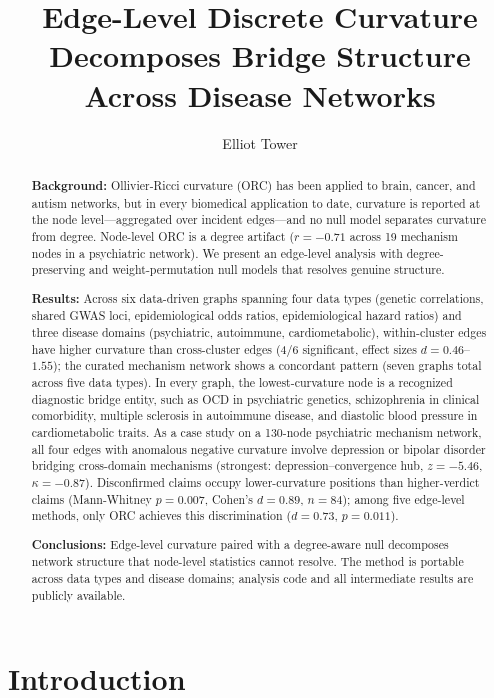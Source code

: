 \documentclass[11pt]{article}
\title{Edge-Level Discrete Curvature Decomposes Bridge Structure Across Disease Networks}
\author{Elliot Tower}
\affil{Independent researcher \\ \texttt{elliot@elliottower.ai}}
\date{}
\begin{document}
\maketitle

\begin{abstract}
\textbf{Background:}
Ollivier-Ricci curvature (ORC) has been applied to brain, cancer, and autism networks, but in every biomedical application to date, curvature is reported at the node level---aggregated over incident edges---and no null model separates curvature from degree. Node-level ORC is a degree artifact ($r = -0.71$ across 19 mechanism nodes in a psychiatric network). We present an edge-level analysis with degree-preserving and weight-permutation null models that resolves genuine structure.

\textbf{Results:}
Across six data-driven graphs spanning four data types (genetic correlations, shared GWAS loci, epidemiological odds ratios, epidemiological hazard ratios) and three disease domains (psychiatric, autoimmune, cardiometabolic), within-cluster edges have higher curvature than cross-cluster edges (4/6 significant, effect sizes $d = 0.46$--$1.55$); the curated mechanism network shows a concordant pattern (seven graphs total across five data types). In every graph, the lowest-curvature node is a recognized diagnostic bridge entity, such as OCD in psychiatric genetics, schizophrenia in clinical comorbidity, multiple sclerosis in autoimmune disease, and diastolic blood pressure in cardiometabolic traits. As a case study on a 130-node psychiatric mechanism network, all four edges with anomalous negative curvature involve depression or bipolar disorder bridging cross-domain mechanisms (strongest: depression--convergence hub, $z = -5.46$, $\kappa = -0.87$). Disconfirmed claims occupy lower-curvature positions than higher-verdict claims (Mann-Whitney $p = 0.007$, Cohen's $d = 0.89$, $n = 84$); among five edge-level methods, only ORC achieves this discrimination ($d = 0.73$, $p = 0.011$).

\textbf{Conclusions:}
Edge-level curvature paired with a degree-aware null decomposes network structure that node-level statistics cannot resolve. The method is portable across data types and disease domains; analysis code and all intermediate results are publicly available.
\end{abstract}

\section{Introduction}
\end{document}
